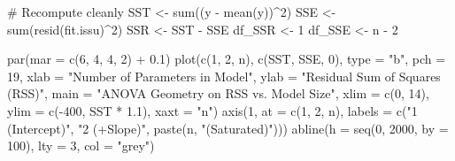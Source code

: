 \documentclass[
  letterpaper,
  DIV=11,
  numbers=noendperiod]{scrreprt}
\newenvironment{Shaded}{\begin{snugshade}}{\end{snugshade}}
\newcommand{\AttributeTok}[1]{\textcolor[rgb]{0.40,0.45,0.13}{#1}}
\newcommand{\CommentTok}[1]{\textcolor[rgb]{0.37,0.37,0.37}{#1}}
\newcommand{\DecValTok}[1]{\textcolor[rgb]{0.68,0.00,0.00}{#1}}
\newcommand{\FloatTok}[1]{\textcolor[rgb]{0.68,0.00,0.00}{#1}}
\newcommand{\FunctionTok}[1]{\textcolor[rgb]{0.28,0.35,0.67}{#1}}
\newcommand{\NormalTok}[1]{\textcolor[rgb]{0.00,0.23,0.31}{#1}}
\newcommand{\OtherTok}[1]{\textcolor[rgb]{0.00,0.23,0.31}{#1}}
\newcommand{\SpecialCharTok}[1]{\textcolor[rgb]{0.37,0.37,0.37}{#1}}
\newcommand{\StringTok}[1]{\textcolor[rgb]{0.13,0.47,0.30}{#1}}
\begin{document}
\begin{Shaded}
\begin{Highlighting}[]
\CommentTok{\# Recompute cleanly}
\NormalTok{SST }\OtherTok{\textless{}{-}} \FunctionTok{sum}\NormalTok{((y }\SpecialCharTok{{-}} \FunctionTok{mean}\NormalTok{(y))}\SpecialCharTok{\^{}}\DecValTok{2}\NormalTok{)}
\NormalTok{SSE }\OtherTok{\textless{}{-}} \FunctionTok{sum}\NormalTok{(}\FunctionTok{resid}\NormalTok{(fit.issu)}\SpecialCharTok{\^{}}\DecValTok{2}\NormalTok{)}
\NormalTok{SSR }\OtherTok{\textless{}{-}}\NormalTok{ SST }\SpecialCharTok{{-}}\NormalTok{ SSE}
\NormalTok{df\_SSR }\OtherTok{\textless{}{-}} \DecValTok{1}
\NormalTok{df\_SSE }\OtherTok{\textless{}{-}}\NormalTok{ n }\SpecialCharTok{{-}} \DecValTok{2}

\FunctionTok{par}\NormalTok{(}\AttributeTok{mar =} \FunctionTok{c}\NormalTok{(}\DecValTok{6}\NormalTok{, }\DecValTok{4}\NormalTok{, }\DecValTok{4}\NormalTok{, }\DecValTok{2}\NormalTok{) }\SpecialCharTok{+} \FloatTok{0.1}\NormalTok{)}
\FunctionTok{plot}\NormalTok{(}\FunctionTok{c}\NormalTok{(}\DecValTok{1}\NormalTok{, }\DecValTok{2}\NormalTok{, n), }\FunctionTok{c}\NormalTok{(SST, SSE, }\DecValTok{0}\NormalTok{), }\AttributeTok{type =} \StringTok{"b"}\NormalTok{, }\AttributeTok{pch =} \DecValTok{19}\NormalTok{,}
     \AttributeTok{xlab =} \StringTok{"Number of Parameters in Model"}\NormalTok{,}
     \AttributeTok{ylab =} \StringTok{"Residual Sum of Squares (RSS)"}\NormalTok{,}
     \AttributeTok{main =} \StringTok{"ANOVA Geometry on RSS vs. Model Size"}\NormalTok{,}
     \AttributeTok{xlim =} \FunctionTok{c}\NormalTok{(}\DecValTok{0}\NormalTok{, }\DecValTok{14}\NormalTok{), }\AttributeTok{ylim =} \FunctionTok{c}\NormalTok{(}\SpecialCharTok{{-}}\DecValTok{400}\NormalTok{, SST }\SpecialCharTok{*} \FloatTok{1.1}\NormalTok{), }\AttributeTok{xaxt =} \StringTok{"n"}\NormalTok{)}
\FunctionTok{axis}\NormalTok{(}\DecValTok{1}\NormalTok{, }\AttributeTok{at =} \FunctionTok{c}\NormalTok{(}\DecValTok{1}\NormalTok{, }\DecValTok{2}\NormalTok{, n), }\AttributeTok{labels =} \FunctionTok{c}\NormalTok{(}\StringTok{"1 (Intercept)"}\NormalTok{, }\StringTok{"2 (+Slope)"}\NormalTok{, }\FunctionTok{paste}\NormalTok{(n, }\StringTok{"(Saturated)"}\NormalTok{)))}
\FunctionTok{abline}\NormalTok{(}\AttributeTok{h =} \FunctionTok{seq}\NormalTok{(}\DecValTok{0}\NormalTok{, }\DecValTok{2000}\NormalTok{, }\AttributeTok{by =} \DecValTok{100}\NormalTok{), }\AttributeTok{lty =} \DecValTok{3}\NormalTok{, }\AttributeTok{col =} \StringTok{"grey"}\NormalTok{)}


\end{Highlighting}
\end{Shaded}
\end{document}

